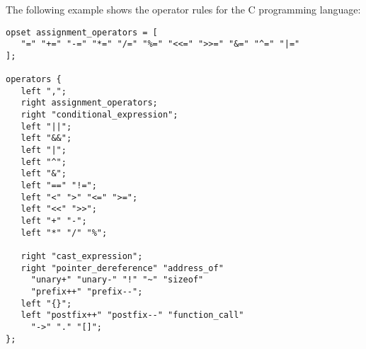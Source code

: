 \begin{grammar}
      \produces {} \lextoken{\{}
	  \lextoken{\}} \\
      \produces {} \lextoken{;} \\
      \produces {}
	  \lextoken{;} \\
      \produces {}  \\
      \produces {}  \\
      \produces {}  \\
      \produces {} \\
      \produces {}  \\
      \produces {} \\
      \produces {} \\
\end{grammar}

\noindent
The following example shows the operator rules for the C
programming language:

\begin{lstlisting}
opset assignment_operators = [
   "=" "+=" "-=" "*=" "/=" "%=" "<<=" ">>=" "&=" "^=" "|="
];

operators {
   left ",";
   right assignment_operators;
   right "conditional_expression";
   left "||";
   left "&&";
   left "|";
   left "^";
   left "&";
   left "==" "!=";
   left "<" ">" "<=" ">=";
   left "<<" ">>";
   left "+" "-";
   left "*" "/" "%";

   right "cast_expression";
   right "pointer_dereference" "address_of"
	 "unary+" "unary-" "!" "~" "sizeof"
	 "prefix++" "prefix--";
   left "{}";
   left "postfix++" "postfix--" "function_call"
	 "->" "." "[]";
};
\end{lstlisting}

\endinput
